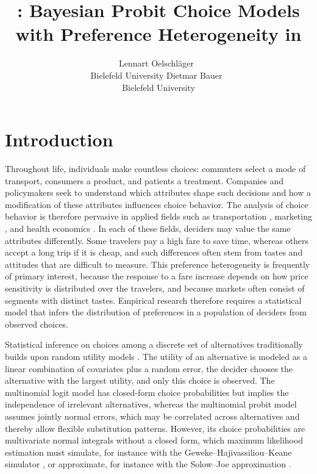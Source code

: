 \documentclass[article,shortnames]{jss}
\author{Lennart Oelschl\"ager~\orcidlink{0000-0001-5421-9313}\\Bielefeld
University \And Dietmar Bauer~\orcidlink{0000-0003-2920-7032}\\Bielefeld
University}
\title{\pkg{RprobitB}: Bayesian Probit Choice Models with Preference
Heterogeneity in \proglang{R}}
\begin{document}
\section{Introduction} \label{sec:introduction}

Throughout life, individuals make countless choices: commuters select a mode of
transport, consumers a product, and patients a treatment. Companies and
policymakers seek to understand which attributes shape such decisions and how a
modification of these attributes influences choice behavior. The analysis of
choice behavior is therefore pervasive in applied fields such as transportation
\citep{Helveston2015}, marketing \citep{Brand2022}, and health economics
\citep{vanKinschot2021}. In each of these fields, deciders may value the same
attributes differently. Some travelers pay a high fare to save time, whereas
others accept a long trip if it is cheap, and such differences often stem from
tastes and attitudes that are difficult to measure. This preference
heterogeneity is frequently of primary interest, because the response to a fare
increase depends on how price sensitivity is distributed over the travelers, and
because markets often consist of segments with distinct tastes. Empirical
research therefore requires a statistical model that infers the distribution of
preferences in a population of deciders from observed choices.

Statistical inference on choices among a discrete set of alternatives
traditionally builds upon random utility models \citep{Train2009}. The utility
of an alternative is modeled as a linear combination of covariates plus a random
error, the decider chooses the alternative with the largest utility, and only
this choice is observed. The multinomial logit model has closed-form choice
probabilities but implies the independence of irrelevant alternatives, whereas
the multinomial probit model assumes jointly normal errors, which may be
correlated across alternatives and thereby allow flexible substitution patterns.
However, its choice probabilities are multivariate normal integrals without a
closed form, which maximum likelihood estimation must simulate, for instance
with the Geweke--Hajivassiliou--Keane simulator \citep{Hajivassiliou1996}, or
approximate, for instance with the Solow--Joe approximation
\citep{Solow1990, Joe1995}.
\end{document}
